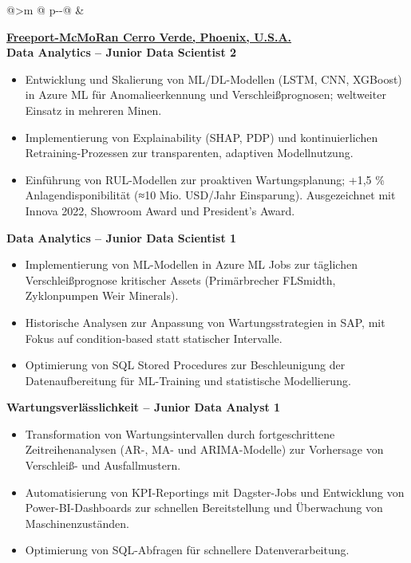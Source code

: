 \begin{tabular}{@{}>{\raggedleft\arraybackslash}m{\datecol} @{\hspace{\colgap}} p{\dimexpr\textwidth-\datecol-\colgap\relax}@{}}
 &
\begin{minipage}[t]{\linewidth}\vspace{0pt}
\begin{expblock}
  \footnotesize
  \setlength{\parindent}{0pt}\setlength{\parskip}{0pt}
  \textbf{\href{https://www.fcx.com}{Freeport-McMoRan Cerro Verde, Phoenix, U.S.A.}}\\[-0.1em]
  \textbf{Data Analytics – Junior Data Scientist 2}\\[-1em]
\begin{itemize}[nosep,leftmargin=1em]
  \item Entwicklung und Skalierung von ML/DL-Modellen (LSTM, CNN, XGBoost) in Azure ML für Anomalieerkennung und Verschleißprognosen; weltweiter Einsatz in mehreren Minen.
  \item Implementierung von Explainability (SHAP, PDP) und kontinuierlichen Retraining-Prozessen zur transparenten, adaptiven Modellnutzung.
  \item Einführung von RUL-Modellen zur proaktiven Wartungsplanung; +1,5 \% Anlagendisponibilität (≈10 Mio. USD/Jahr Einsparung). Ausgezeichnet mit Innova 2022, Showroom Award und President’s Award.
\end{itemize}


  \textbf{Data Analytics – Junior Data Scientist 1}\\[-1em]
  \begin{itemize}[nosep,leftmargin=1em]
    \item Implementierung von ML-Modellen in Azure ML Jobs zur täglichen Verschleißprognose kritischer Assets (Primärbrecher FLSmidth, Zyklonpumpen Weir Minerals).
    \item Historische Analysen zur Anpassung von Wartungsstrategien in SAP, mit Fokus auf condition-based statt statischer Intervalle.
  \item Optimierung von SQL Stored Procedures zur Beschleunigung der Datenaufbereitung für ML-Training und statistische Modellierung.\\[-1em]
  \end{itemize}

  \textbf{Wartungsverlässlichkeit – Junior Data Analyst 1}\\[-1em]
  \begin{itemize}[nosep,leftmargin=1em]
    \item Transformation von Wartungsintervallen durch fortgeschrittene Zeitreihenanalysen (AR-, MA- und ARIMA-Modelle) zur Vorhersage von Verschleiß- und Ausfallmustern.
    \item Automatisierung von KPI-Reportings mit Dagster-Jobs und Entwicklung von Power-BI-Dashboards zur schnellen Bereitstellung und Überwachung von Maschinenzuständen.
    \item Optimierung von SQL-Abfragen für schnellere Datenverarbeitung.\\[-1em]
  \end{itemize}


\end{expblock}
\end{minipage}
\end{tabular}
